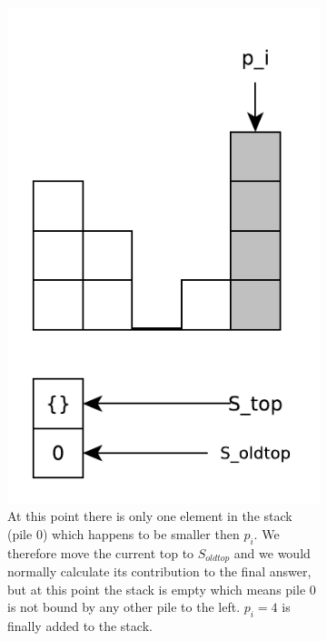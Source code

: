 \begin{figure}
\begin{subfigure}[t]{0.24\textwidth}
		\includegraphics[width=1\linewidth]{sources/trapping_water/images/stack_ex7}
		\caption{At this point there is only one element in the stack (pile $0$) which happens to be smaller then $p_i$. We therefore move the current top to $S_{oldtop}$ and we would normally calculate its contribution to the final answer, but at this point the stack is empty which means pile $0$ is not bound by any other pile to the left. $p_i=4$ is finally added to the stack.}
		\label{fig:trapping_water:stack_ex3}
	 \end{subfigure}
	 \hfill
	 \begin{subfigure}[t]{0.24\textwidth}

\end{subfigure}
\end{figure}
